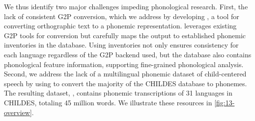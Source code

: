 
We thus identify two major challenges impeding phonological research. First, the lack of consistent G2P conversion, which we address by developing \gpp, a tool for converting orthographic text to a phonemic representation. \gpp leverages existing G2P tools for conversion but carefully maps the output to established phonemic inventories in the \phoible database. Using \phoible inventories not only ensures consistency for each language regardless of the G2P backend used, but the database also contains phonological feature information, supporting fine-grained phonological analysis. Second, we address the lack of a multilingual phonemic dataset of child-centered speech by using \gpp to convert the majority of the CHILDES database to phonemes. The resulting dataset, \ipachildes, contains phonemic transcriptions of 31 languages in CHILDES, totaling 45 million words. We illustrate these resources in \cref{fig:13-overview}.



